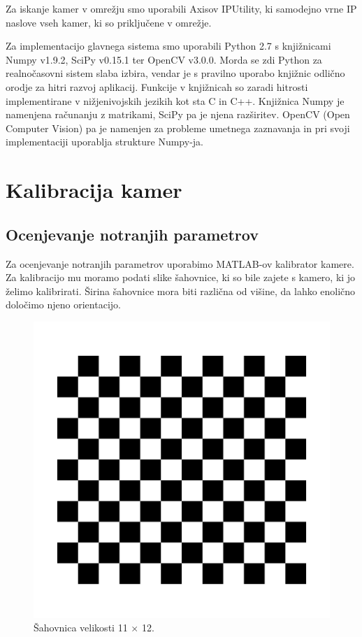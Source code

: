 \documentclass[a4paper, 12pt]{book}
\begin{document}
Za iskanje kamer v omrežju smo uporabili Axisov IPUtility, ki samodejno vrne IP naslove vseh kamer, ki so priključene v omrežje.

Za implementacijo glavnega sistema smo uporabili Python 2.7 s knjižnicami Numpy v1.9.2, SciPy v0.15.1 ter OpenCV v3.0.0. Morda se zdi Python za realnočasovni sistem slaba izbira, vendar je s pravilno uporabo knjižnic odlično orodje za hitri razvoj aplikacij. Funkcije v knjižnicah so zaradi hitrosti implementirane v nižjenivojskih jezikih kot sta C in C++. Knjižnica Numpy je namenjena računanju z matrikami, SciPy pa je njena razširitev. OpenCV (Open Computer Vision) pa je namenjen za probleme umetnega zaznavanja in pri svoji implementaciji uporablja strukture Numpy-ja. 

\section{Kalibracija kamer}\label{camcalsec}
\subsection{Ocenjevanje notranjih parametrov}
Za ocenjevanje notranjih parametrov uporabimo MATLAB-ov kalibrator kamere. Za kalibracijo mu moramo podati slike šahovnice, ki so bile zajete s kamero, ki jo želimo kalibrirati. Širina šahovnice mora biti različna od višine, da lahko enolično določimo njeno orientacijo. 
\begin{figure}[H]
\centering
\includegraphics[scale=0.4]{checkerboard.png}
\caption{Šahovnica velikosti 11 $\times$ 12.}
\end{figure}
\end{document}
